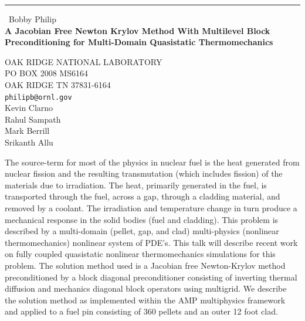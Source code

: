 \documentclass{report}
\begin{document}
\begin{center}
\rule{6in}{1pt} \
{\large Bobby Philip \\
{\bf A Jacobian Free Newton Krylov Method With Multilevel Block Preconditioning for Multi-Domain Quasistatic Thermomechanics}}

OAK RIDGE NATIONAL LABORATORY \\ PO BOX 2008 MS6164 \\ OAK RIDGE TN 37831-6164
\\
{\tt philipb@ornl.gov}\\
Kevin Clarno\\
Rahul Sampath\\
Mark Berrill\\
Srikanth Allu\end{center}


The source-term for most of the physics in nuclear fuel is the heat
generated from nuclear fission and the resulting transmutation (which
includes fission) of the materials due to irradiation. The heat,
primarily generated in the fuel, is transported through the fuel, across
a gap, through a cladding material, and removed by a coolant. The
irradiation and temperature change in turn produce a mechanical response
in the solid bodies (fuel and cladding). This problem is described by a
multi-domain (pellet, gap, and clad) multi-physics (nonlinear
thermomechanics) nonlinear system of PDE's. This talk will describe
recent work on fully coupled quasistatic nonlinear thermomechanics
simulations for this problem. The solution method used is a Jacobian free
Newton-Krylov method preconditioned by a block diagonal preconditioner
consisting of inverting thermal diffusion and mechanics diagonal block
operators using multigrid. We describe the solution method as implemented
within the AMP multiphysics framework and applied to a fuel pin
consisting of 360 pellets and an outer 12 foot clad.
\end{document}
